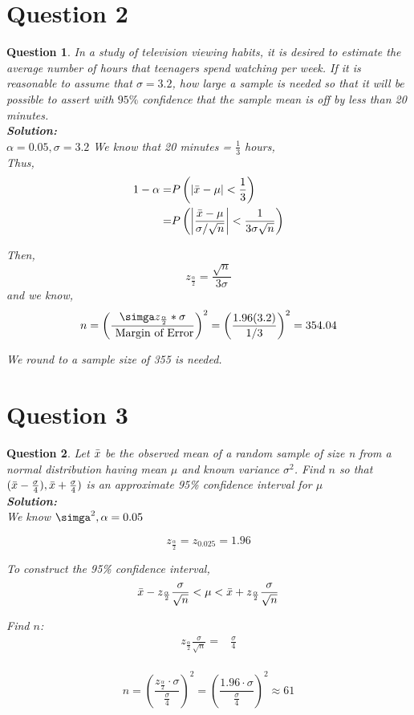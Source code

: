 \documentclass{article}
\theoremstyle{questionstyle}
\newtheorem{myquestion}{Question}
\begin{document}
\section{Question 2}
\begin{myquestion}
In a study of television viewing habits, it is desired to estimate the average number of hours that teenagers spend watching per week. If it is reasonable to assume that \(\sigma = 3.2\), how large a sample is needed so that it will be possible to assert with \(95\%\) confidence that the sample mean is off by less than 20 minutes.\\


\textbf{Solution:}\\
\(\alpha = 0.05, \sigma = 3.2\)
We know that 20 minutes = \(\frac{1}{3}\) hours,\\
Thus, 
\begin{align*}
    1 - \alpha =& P \left( |\Bar{x} - \mu| < \frac{1}{3} \right)\\
    =& P \left( \left|\frac{\Bar{x} - \mu}{\sigma/\sqrt{n}} \right| < \frac{1}{3\sigma\sqrt{n}} \right)\\
\end{align*}

Then, 
\[z_{\frac{\alpha}{2}} = \frac{\sqrt{n}}{3\sigma}\]
and we know, 
\[n = \left(\frac{\simga z_{\frac{\alpha}{2}}*\sigma}{\text{ Margin of Error}}\right)^2 = \left(\frac{1.96(3.2)}{1/3}\right)^2 = 354.04\]

We round to a sample size of 355 is needed. 
\end{myquestion}

\section{Question 3}
\begin{myquestion}
    Let \(\Bar{x}\) be the observed mean of a random sample of size n from a normal distribution having mean \(\mu\) and known variance \(\sigma^2\). Find \(n\) so that \( (\Bar{x} - \frac{\sigma}{4}), \Bar{x} + \frac{\sigma}{4}) \) is an approximate 95\% confidence interval for \(\mu\)\\

\textbf{Solution:}\\
We know \(\simga^2, \alpha = 0.05\)

\[z_{\frac{\alpha}{2}} = z_{0.025} = 1.96\]

To construct the 95\% confidence interval, 
\[ \Bar{x} - z_{\frac{\alpha}{2}}\frac{\sigma}{\sqrt{n}} < \mu < \Bar{x} + z_{\frac{\alpha}{2}}\frac{\sigma}{\sqrt{n}} \]

Find \(n\): 
\begin{align*}
    z_{\frac{\alpha}{2}}\frac{\sigma}{\sqrt{n}} =& \frac{\sigma}{4}\\
\end{align*}

\[
n = \left(\frac{z_{\frac{\alpha}{2}} \cdot \sigma}{\frac{\sigma}{4}}\right)^2 = \left(\frac{1.96 \cdot \sigma}{\frac{\sigma}{4}}\right)^2 \approx 61
\]

\end{myquestion}
\end{document}
